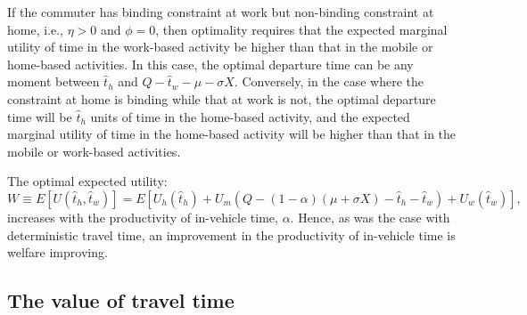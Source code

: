 \documentclass[12pt,a4paper,british]{article}
\begin{document}
If the commuter has binding constraint at work but non-binding constraint at home, i.e., $\eta>0$ and $\phi=0$, then optimality requires that the expected marginal utility of time in the work-based activity be higher than that in the mobile or home-based activities. In this case, the optimal departure time can be any moment between $\hat{t}_{h}$ and $Q-\hat{t}_{w}-\mu-\sigma X$. Conversely, in the case where the constraint at home is binding while that at work is not, the optimal departure time will be $\hat{t}_{h}$ units of time in the home-based activity, and the expected marginal utility of time in the home-based activity will be higher than that in the mobile or work-based activities.

The optimal expected utility: 
\begin{equation*}
W\equiv E\left[U\left(\hat{t}_{h},\hat{t}_{w}\right)\right]=E\left[U_{h}\left(\hat{t}_{h}\right)+U_{m}\left(Q-\left(1-\alpha\right)\left(\mu+\sigma X\right)-\hat{t}_{h}-\hat{t}_{w}\right)+U_{w}\left(\hat{t}_{w}\right)\right],
\end{equation*}
increases with the productivity of in-vehicle time, $\alpha$. Hence, as was the case with deterministic travel time, an improvement in the productivity of in-vehicle time is welfare improving.



\subsection*{The value of travel time}
\end{document}
